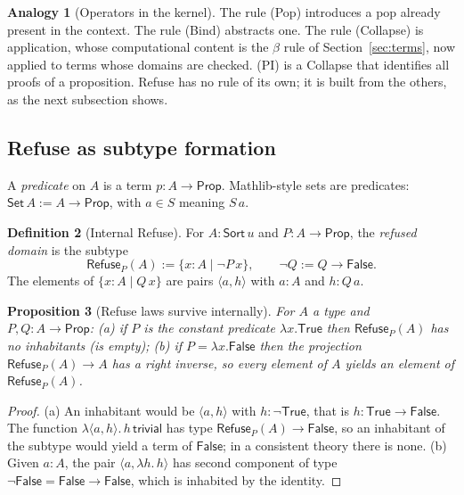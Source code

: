 \documentclass[11pt]{article}
\newcommand{\Refuse}{\mathsf{Refuse}}
\newcommand{\Sort}{\mathsf{Sort}}
\newcommand{\Prop}{\mathsf{Prop}}
\theoremstyle{definition}
\newtheorem{definition}{Definition}[section]
\newtheorem{analogy}[definition]{Analogy}
\theoremstyle{plain}
\newtheorem{proposition}[definition]{Proposition}
\theoremstyle{remark}
\begin{document}
\begin{analogy}[Operators in the kernel]\label{an:kernel}
The rule (Pop) introduces a pop already present in the context. The rule (Bind) abstracts one. The rule (Collapse) is application, whose computational content is the $\beta$ rule of Section~\ref{sec:terms}, now applied to terms whose domains are checked. (PI) is a Collapse that identifies all proofs of a proposition. Refuse has no rule of its own; it is built from the others, as the next subsection shows.
\end{analogy}

\subsection{Refuse as subtype formation}

A \emph{predicate} on $A$ is a term $p:A\to\Prop$. Mathlib-style sets are predicates: $\mathsf{Set}\,A:=A\to\Prop$, with $a\in S$ meaning $S\,a$.

\begin{definition}[Internal Refuse]\label{def:intref}
For $A:\Sort\,u$ and $P:A\to\Prop$, the \emph{refused domain} is the subtype
\[
\Refuse_P(A):=\{x:A\mid\neg P\,x\},\qquad \neg Q:=Q\to\mathsf{False}.
\]
The elements of $\{x:A\mid Q\,x\}$ are pairs $\langle a,h\rangle$ with $a:A$ and $h:Q\,a$.
\end{definition}

\begin{proposition}[Refuse laws survive internally]\label{prop:intref}
For $A$ a type and $P,Q:A\to\Prop$:
(a) if $P$ is the constant predicate $\lambda x.\mathsf{True}$ then $\Refuse_P(A)$ has no inhabitants (is empty);
(b) if $P=\lambda x.\mathsf{False}$ then the projection $\Refuse_P(A)\to A$ has a right inverse, so every element of $A$ yields an element of $\Refuse_P(A)$.
\end{proposition}
\begin{proof}
(a) An inhabitant would be $\langle a,h\rangle$ with $h:\neg\mathsf{True}$, that is $h:\mathsf{True}\to\mathsf{False}$. The function $\lambda\langle a,h\rangle.\,h\,\mathsf{trivial}$ has type $\Refuse_P(A)\to\mathsf{False}$, so an inhabitant of the subtype would yield a term of $\mathsf{False}$; in a consistent theory there is none. (b) Given $a:A$, the pair $\langle a,\lambda h.\,h\rangle$ has second component of type $\neg\mathsf{False}=\mathsf{False}\to\mathsf{False}$, which is inhabited by the identity.
\end{proof}
\end{document}
